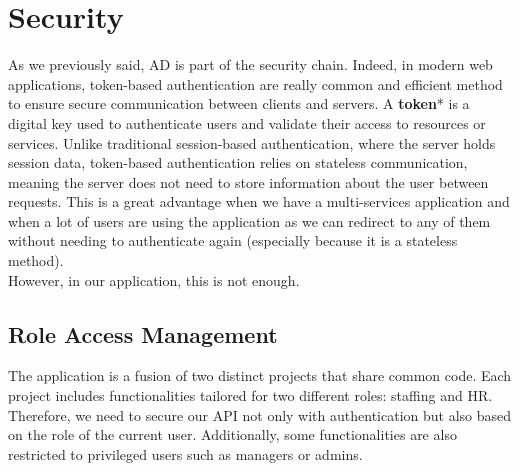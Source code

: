 \documentclass[12pt,a4paper,table,english]{article}
\begin{document}
	
	
	\newpage
	
	\section{Security}

	As we previously said, AD is part of the security chain. Indeed, in modern web applications, token-based authentication are really common and efficient method to ensure secure communication between clients and servers. A \textbf{token}* is a digital key used to authenticate users and validate their access to resources or services. Unlike traditional session-based authentication, where the server holds session data, token-based authentication relies on stateless communication, meaning the server does not need to store information about the user between requests. This is a great advantage when we have a multi-services application and when a lot of users are using the application as we can redirect to any of them without needing to authenticate again (especially because it is a stateless method).\\
	However, in our application, this is not enough.
	
	\subsection{Role Access Management}
	The application is a fusion of two distinct projects that share common code. Each project includes functionalities tailored for two different roles: staffing and HR. Therefore, we need to secure our API not only with authentication but also based on the role of the current user. Additionally, some functionalities are also restricted to privileged users such as managers or admins. 
	
\end{document}
